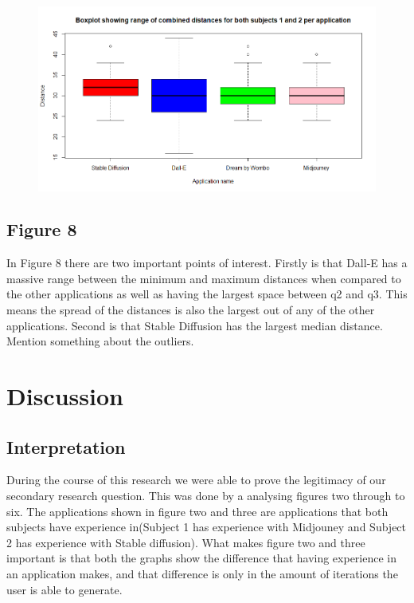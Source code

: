\documentclass[]{report}
\begin{document}
	\begin{figure}[!htbp]
		\centering
		\includegraphics[width=1\linewidth]{boxplotWithAllData}
		\caption{}
		\label{fig:boxplotwithalldata}
	\end{figure}
\pagebreak
\subsection{Figure 8}
	
	In Figure 8 there are two important points of interest. Firstly is that Dall-E has a massive range between the minimum and maximum distances when compared to the other applications as well as having the largest space between q2 and q3. This means the spread of the distances is also the largest out of any of the other applications. Second is that Stable Diffusion has the largest median distance. Mention something about the outliers.
	
	
	\pagebreak
	\section{Discussion}
	
	\subsection{Interpretation}
	
	During the course of this research we were able to prove the legitimacy of our secondary research question. This was done by a analysing figures two through to six. The applications shown in figure two and three are applications that both subjects have experience in(Subject 1 has experience with Midjouney and Subject 2 has experience with Stable diffusion). What makes figure two and three important is that both the graphs show the difference that having experience in an application makes, and that difference is only in the amount of iterations the user is able to generate. 
	
\end{document}
